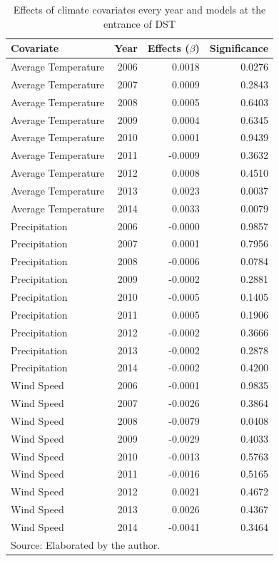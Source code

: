 \documentclass[12pt,openright,oneside,a4paper,english,french,spanish]{abntex2}
\numberwithin{table}{section} %
\numberwithin{figure}{section} %
\begin{document}
\begin{otherlanguage}{english}
\begin{table}[H]
\caption{Effects of climate covariates every year and models at the entrance of DST}
\begin{center}
\begin{small}
\begin{tabular}{lrrr}
  \hline
Covariate & Year & Effects ($\beta$) & Significance \\ 
  \hline
Average Temperature &  2006 & 0.0018 & 0.0276 \\ 
Average Temperature &  2007 & 0.0009 & 0.2843 \\ 
Average Temperature &  2008 & 0.0005 & 0.6403 \\ 
Average Temperature &  2009 & 0.0004 & 0.6345 \\ 
Average Temperature &  2010 & 0.0001 & 0.9439 \\ 
Average Temperature &  2011 & -0.0009 & 0.3632 \\ 
Average Temperature &  2012 & 0.0008 & 0.4510 \\ 
Average Temperature &  2013 & 0.0023 & 0.0037 \\ 
Average Temperature &  2014 & 0.0033 & 0.0079 \\ 
Precipitation &  2006 & -0.0000 & 0.9857 \\ 
Precipitation &  2007 & 0.0001 & 0.7956 \\ 
Precipitation &  2008 & -0.0006 & 0.0784 \\ 
Precipitation &  2009 & -0.0002 & 0.2881 \\ 
Precipitation &  2010 & -0.0005 & 0.1405 \\ 
Precipitation &  2011 & 0.0005 & 0.1906 \\ 
Precipitation &  2012 & -0.0002 & 0.3666 \\ 
Precipitation &  2013 & -0.0002 & 0.2878 \\ 
Precipitation &  2014 & -0.0002 & 0.4200 \\ 
Wind Speed &  2006 & -0.0001 & 0.9835 \\ 
Wind Speed &  2007 & -0.0026 & 0.3864 \\ 
Wind Speed &  2008 & -0.0079 & 0.0408 \\ 
Wind Speed &  2009 & -0.0029 & 0.4033 \\ 
Wind Speed &  2010 & -0.0013 & 0.5763 \\ 
Wind Speed &  2011 & -0.0016 & 0.5165 \\ 
Wind Speed &  2012 & 0.0021 & 0.4672 \\ 
Wind Speed &  2013 & 0.0026 & 0.4367 \\ 
Wind Speed &  2014 & -0.0041 & 0.3464 \\
   \hline
\multicolumn{4}{l}{Source: Elaborated by the author.}
\end{tabular}
\end{small}
\end{center}
\label{tab:resultados_betas_entrada_RS}
\end{table}


\end{otherlanguage}
\end{document}
